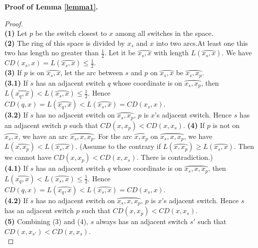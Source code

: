 \documentclass[10pt,conference]{IEEEtran}
\begin{document}
{\small

 }

\begin{appendix}

\textbf{Proof of Lemma \ref{lemma1}.}
\begin{proof} \hspace{20 mm}\\
\textbf{(1)} Let $p$ be the switch closest to $x$ among all switches in the space.\\
\textbf{(2)} The ring of this space is divided by $x_s$ and $x$ into two arcs.At least one this two has length no greater than $\frac{1}{2}$. Let it be $\wideparen{x_s, x}$ with length $L(\wideparen{x_s, x})$. We have $CD(x_s, x) = L(\wideparen{x_s, x}) \leq \frac{1}{2}$.\\
\textbf{(3)} If $p$ is on $\wideparen{x_s, x}$, let the arc between $s$ and $p$ on $\wideparen{x_s, x}$ be $\wideparen{x_s, x_p}$.\\
\textbf{(3.1)} If $s$ has an adjacent switch $q$ whose coordinate is on $\wideparen{x_s, x_p}$, then $L(\wideparen{x_q, x}) < L(\wideparen{x_s, x}) \leq \frac{1}{2}$. Hence $CD(q, x)= L(\wideparen{x_q, x}) < L(\wideparen{x_s, x}) = CD(x_s, x)$.\\
\textbf{(3.2)} If $s$ has no adjacent switch on $\wideparen{x_s, x_p}$, $p$ is $x$'s adjacent switch. Hence $s$ has an adjacent switch $p$  such that $CD(x, x_{p})< CD(x, x_s)$.
\textbf{(4)} If $p$ is not on $\wideparen{x_s, x}$, we have an arc $\wideparen{x_s, x, x_p}$. For the arc $\wideparen{x, x_p}$ on $\wideparen{x_s, x, x_p}$, we have $L(\wideparen{x, x_p}) < L(\wideparen{x_s, x}) $. (Assume to the contrary if $L(\wideparen{x, x_p}) \geq L(\wideparen{x_s, x})$. Then we cannot have $CD(x, x_{p})< CD(x, x_s)$. There is contradiction.)\\
\textbf{(4.1)} If $s$ has an adjacent switch $q$ whose coordinate is on $\wideparen{x_s, x, x_p}$, then $L(\wideparen{x_q, x}) < L(\wideparen{x_s, x}) \leq \frac{1}{2}$. Hence $CD(q, x)= L(\wideparen{x_q, x}) < L(\wideparen{x_s, x}) = CD(x_s, x)$.\\
\textbf{(4.2)} If $s$ has no adjacent switch on $\wideparen{x_s, x, x_p}$, $p$ is $x$'s adjacent switch. Hence $s$ has an adjacent switch $p$  such that $CD(x, x_{p})< CD(x, x_s)$.\\
\textbf{(5)} Combining (3) and (4), $s$ always has an adjacent switch $s'$ such that $CD(x, x_{s'})< CD(x, x_s)$.\\
\end{proof}


\end{appendix}
\end{document}
